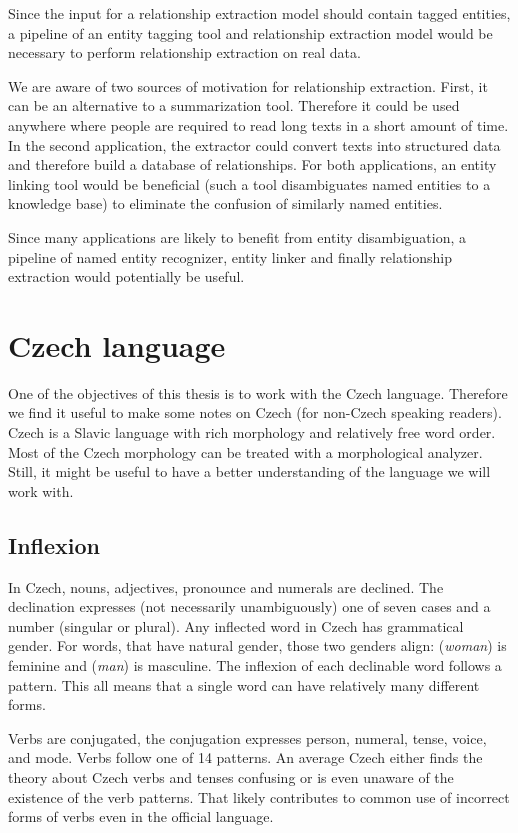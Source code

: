 Since the input for a relationship extraction model should contain tagged entities, a pipeline of an entity tagging tool and relationship extraction model would be necessary to perform relationship extraction on real data. 

We are aware of two sources of motivation for relationship extraction. First, it can be an alternative to a summarization tool. Therefore it could be used anywhere where people are required to read long texts in a short amount of time. In the second application, the extractor could convert texts into structured data and therefore build a database of relationships. For both applications, an entity linking tool would be beneficial (such a tool disambiguates named entities to a knowledge base) to eliminate the confusion of similarly named entities.

Since many applications are likely to benefit from entity disambiguation, a pipeline of named entity recognizer, entity linker and finally relationship extraction would potentially be useful.

\section{Czech language}
One of the objectives of this thesis is to work with the Czech language. Therefore we find it useful to make some notes on Czech (for non-Czech speaking readers). Czech is a Slavic language with rich morphology and relatively free word order. Most of the Czech morphology can be treated with a morphological analyzer. Still, it might be useful to have a better understanding of the language we will work with.

\subsection{Inflexion}
In Czech, nouns, adjectives, pronounce and numerals are declined. The declination expresses (not necessarily unambiguously) one of seven cases and a number (singular or plural). Any inflected word in Czech has grammatical gender. For words, that have natural gender, those two genders align:  (\textit{woman}) is feminine and  (\textit{man}) is masculine. The inflexion of each declinable word follows a pattern. This all means that a single word can have relatively many different forms.

Verbs are conjugated, the conjugation expresses person, numeral, tense, voice, and mode. Verbs follow one of 14 patterns. An average Czech either finds the theory about Czech verbs and tenses confusing or is even unaware of the existence of the verb patterns. That likely contributes to common use of incorrect forms of verbs even in the official language.

